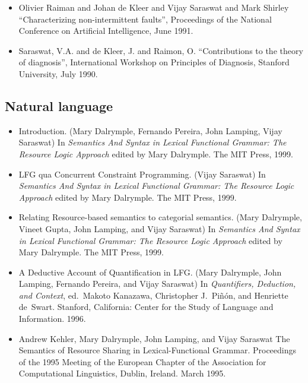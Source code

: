 \documentclass{article}
\begin{document}
\begin{itemize}
\item  Olivier Raiman and Johan de Kleer and Vijay Saraswat and
  Mark Shirley ``Characterizing non-intermittent faults'',
  Proceedings of the National Conference on Artificial
  Intelligence, June 1991.
  
\item  Saraswat, V.A. and de Kleer, J. and Raimon, O.
  ``Contributions to the theory of diagnosis'', International
  Workshop on Principles of Diagnosis, Stanford University, July
  1990.
\end{itemize}
\subsection*{Natural language}
\begin{itemize}

\item Introduction. (Mary Dalrymple, Fernando Pereira, John Lamping,
   Vijay Saraswat) In \textit{Semantics And Syntax in Lexical Functional
   Grammar: The Resource Logic Approach} edited by Mary Dalrymple. The
   MIT Press, 1999.

\item LFG qua Concurrent Constraint Programming. (Vijay Saraswat) In
   \textit{ Semantics And Syntax in Lexical Functional Grammar: The Resource
    Logic Approach} edited by Mary Dalrymple. The MIT Press, 1999.

\item Relating Resource-based semantics to categorial semantics. (Mary
    Dalrymple, Vineet Gupta, John Lamping, and Vijay Saraswat) In
   \textit{ Semantics And Syntax in Lexical Functional Grammar: The Resource
    Logic Approach} edited by Mary Dalrymple. The MIT Press, 1999.

\item    A Deductive Account of Quantification in LFG.  (Mary
    Dalrymple, John Lamping, Fernando Pereira, and Vijay
    Saraswat) In \textit{ Quantifiers, Deduction, and Context}, ed.\
    Makoto Kanazawa, Christopher J.~Pi\~{n}\'{o}n, and Henriette
    de~Swart.  Stanford, California: Center for the Study of
    Language and Information.  1996. 

\item    Andrew Kehler, Mary Dalrymple, John Lamping, and Vijay Saraswat
    The Semantics of Resource Sharing in Lexical-Functional Grammar.  
    Proceedings of the 1995 Meeting of the
    European Chapter of the Association for Computational
    Linguistics, Dublin, Ireland. March 1995.


\end{itemize}
\end{document}
